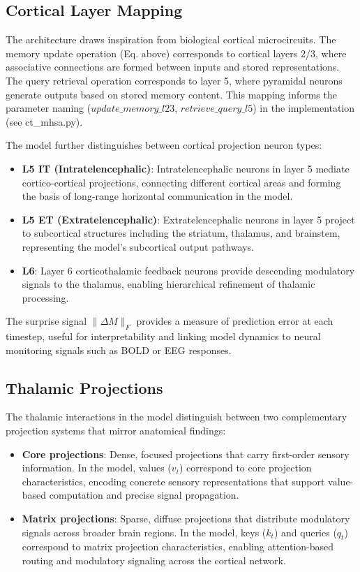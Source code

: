 \subsection{Cortical Layer Mapping}

The architecture draws inspiration from biological cortical microcircuits. The memory update operation (Eq. above) corresponds to cortical layers 2/3, where associative connections are formed between inputs and stored representations. The query retrieval operation corresponds to layer 5, where pyramidal neurons generate outputs based on stored memory content. This mapping informs the parameter naming ($update\_memory\_l23$, $retrieve\_query\_l5$) in the implementation (see ct\_mhsa.py).

The model further distinguishes between cortical projection neuron types:
\begin{itemize}
	\item \textbf{L5 IT (Intratelencephalic)}: Intratelencephalic neurons in layer 5 mediate cortico-cortical projections, connecting different cortical areas and forming the basis of long-range horizontal communication in the model.
	\item \textbf{L5 ET (Extratelencephalic)}: Extratelencephalic neurons in layer 5 project to subcortical structures including the striatum, thalamus, and brainstem, representing the model's subcortical output pathways.
	\item \textbf{L6}: Layer 6 corticothalamic feedback neurons provide descending modulatory signals to the thalamus, enabling hierarchical refinement of thalamic processing.
\end{itemize}

The surprise signal $\| \Delta M \|_F$ provides a measure of prediction error at each timestep, useful for interpretability and linking model dynamics to neural monitoring signals such as BOLD or EEG responses.

\subsection{Thalamic Projections}

The thalamic interactions in the model distinguish between two complementary projection systems that mirror anatomical findings:

\begin{itemize}
	\item \textbf{Core projections}: Dense, focused projections that carry first-order sensory information. In the model, values ($v_t$) correspond to core projection characteristics, encoding concrete sensory representations that support value-based computation and precise signal propagation.
	\item \textbf{Matrix projections}: Sparse, diffuse projections that distribute modulatory signals across broader brain regions. In the model, keys ($k_t$) and queries ($q_t$) correspond to matrix projection characteristics, enabling attention-based routing and modulatory signaling across the cortical network.
\end{itemize}
